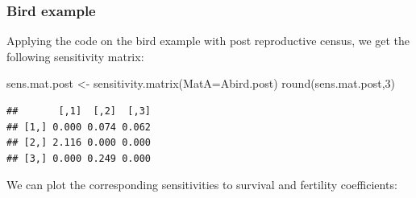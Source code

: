 \documentclass[
]{book}
\newenvironment{Shaded}{\begin{snugshade}}{\end{snugshade}}
\newcommand{\AttributeTok}[1]{\textcolor[rgb]{0.77,0.63,0.00}{#1}}
\newcommand{\DecValTok}[1]{\textcolor[rgb]{0.00,0.00,0.81}{#1}}
\newcommand{\FunctionTok}[1]{\textcolor[rgb]{0.00,0.00,0.00}{#1}}
\newcommand{\NormalTok}[1]{#1}
\newcommand{\OtherTok}[1]{\textcolor[rgb]{0.56,0.35,0.01}{#1}}
\begin{document}
\hypertarget{bird-example-11}{%
\subsubsection*{Bird example}\label{bird-example-11}}

Applying the code on the bird example with post reproductive census, we get the following sensitivity matrix:

\begin{Shaded}
\begin{Highlighting}[]
\NormalTok{sens.mat.post }\OtherTok{\textless{}{-}} \FunctionTok{sensitivity.matrix}\NormalTok{(}\AttributeTok{MatA=}\NormalTok{Abird.post)}
\FunctionTok{round}\NormalTok{(sens.mat.post,}\DecValTok{3}\NormalTok{)}
\end{Highlighting}
\end{Shaded}

\begin{verbatim}
##       [,1]  [,2]  [,3]
## [1,] 0.000 0.074 0.062
## [2,] 2.116 0.000 0.000
## [3,] 0.000 0.249 0.000
\end{verbatim}

We can plot the corresponding sensitivities to survival and fertility coefficients:
\end{document}
